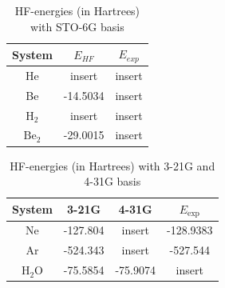 \documentclass[a4paper,10pt, twocolumn, pre]{revtex4}
\begin{document}
\begin{table}[h!tb]
\caption{HF-energies (in Hartrees) with STO-6G basis}
\label{tb:energy_sto6g}
\begin{tabular}[c]{c|c|c}
System & $E_{HF}$ & $E_{exp}$ \\
\hline
He & insert & insert \\
Be & -14.5034 & insert \\
$\mbox{H}_2$ & insert & insert \\
$\mbox{Be}_2$ & -29.0015 & insert \\
\end{tabular}
\end{table}

\begin{table}[h!tb]
\caption{HF-energies (in Hartrees) with 3-21G and 4-31G basis}
\label{tb:energy321g431g}
\begin{tabular}[c]{c|c|c|c}
System & 3-21G & 4-31G & $E_{\mbox{exp}}$ \\
\hline
Ne & -127.804 & insert & -128.9383 \\
Ar & -524.343 &insert & -527.544 \\
$\mbox{H}_2\mbox{O}$ & -75.5854 & -75.9074 & insert \\
\end{tabular}
\end{table}
\end{document}
